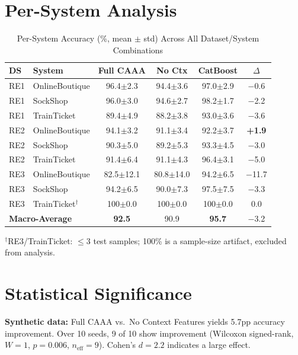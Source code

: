 \documentclass[12pt,a4paper]{report}
\begin{document}
\section{Per-System Analysis}

\begin{table}[h]
    \centering
    \caption{Per-System Accuracy (\%, mean $\pm$ std) Across All Dataset/System Combinations}
    \label{tab:per-system}
    \small
    \begin{tabular}{llcccc}
        \toprule
        \textbf{DS} & \textbf{System} & \textbf{Full CAAA} & \textbf{No Ctx} & \textbf{CatBoost} & \textbf{$\Delta$} \\
        \midrule
        RE1 & OnlineBoutique & 96.4$\pm$2.3 & 94.4$\pm$3.6 & 97.0$\pm$2.9 & $-$0.6 \\
        RE1 & SockShop & 96.0$\pm$3.0 & 94.6$\pm$2.7 & 98.2$\pm$1.7 & $-$2.2 \\
        RE1 & TrainTicket & 89.4$\pm$4.9 & 88.2$\pm$3.8 & 93.0$\pm$3.6 & $-$3.6 \\
        \midrule
        RE2 & OnlineBoutique & 94.1$\pm$3.2 & 91.1$\pm$3.4 & 92.2$\pm$3.7 & \textbf{+1.9} \\
        RE2 & SockShop & 90.3$\pm$5.0 & 89.2$\pm$5.3 & 93.3$\pm$4.5 & $-$3.0 \\
        RE2 & TrainTicket & 91.4$\pm$6.4 & 91.1$\pm$4.3 & 96.4$\pm$3.1 & $-$5.0 \\
        \midrule
        RE3 & OnlineBoutique & 82.5$\pm$12.1 & 80.8$\pm$14.0 & 94.2$\pm$6.5 & $-$11.7 \\
        RE3 & SockShop & 94.2$\pm$6.5 & 90.0$\pm$7.3 & 97.5$\pm$7.5 & $-$3.3 \\
        RE3 & TrainTicket$^\dagger$ & 100$\pm$0.0 & 100$\pm$0.0 & 100$\pm$0.0 & 0.0 \\
        \midrule
        \multicolumn{2}{l}{\textbf{Macro-Average}} & \textbf{92.5} & 90.9 & \textbf{95.7} & $-$3.2 \\
        \bottomrule
    \end{tabular}

    \smallskip
    \footnotesize $^\dagger$RE3/TrainTicket: $\leq$3 test samples; 100\% is a sample-size artifact, excluded from analysis.
\end{table}

\section{Statistical Significance}

\textbf{Synthetic data:} Full CAAA vs.\ No Context Features yields 5.7pp accuracy improvement. Over 10 seeds, 9 of 10 show improvement (Wilcoxon signed-rank, $W = 1$, $p = 0.006$, $n_{\text{eff}} = 9$). Cohen's $d = 2.2$ indicates a large effect.
\end{document}
